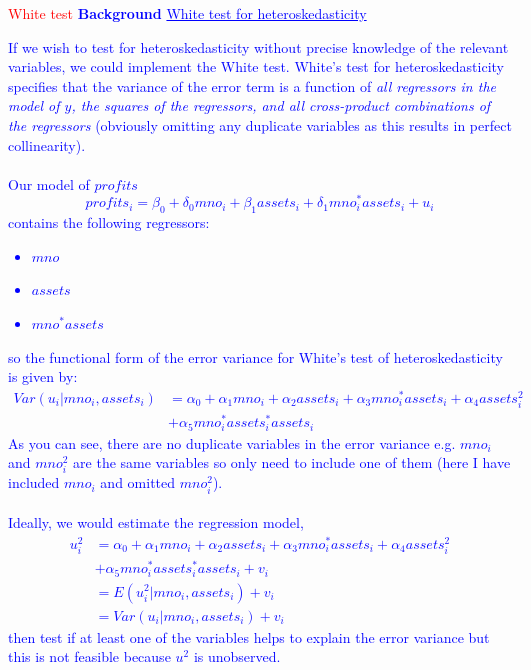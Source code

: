 \documentclass[12pt]{report}
\newenvironment{blueframed}[1][blue]
{\def\FrameCommand{\fboxsep=\FrameSep\fcolorbox{#1}{white}}%
\MakeFramed {\advance\hsize-\width \FrameRestore}}
{\endMakeFramed}
\begin{document}
\newpage
\justify
\noindent \textcolor{red}{White test}
\justify
\begin{blueframed}
	\textcolor{blue}{\textbf{Background}}
	\vspace{-\baselineskip}
	\justify
	\textcolor{blue}{\underline{White test for heteroskedasticity}}
	
	\noindent \textcolor{blue}
	{
		\noindent If we wish to test for heteroskedasticity without precise knowledge of the relevant variables, we could implement the White test. White's test for heteroskedasticity specifies that the variance of the error term is a function of \textit{all regressors in the model of $y$, the squares of the regressors, and all cross-product combinations of the regressors} (obviously omitting any duplicate variables as this results in perfect collinearity). \\ \\ Our model of $profits$ $$profits_i = \beta_0 + \delta_0 mno_i + \beta_1 assets_i + \delta_1 mno_i^*assets_i + u_i$$ contains the following regressors: \begin{itemize} \vspace{-\baselineskip} \item $mno$
				\item $assets$
				\item $mno^*assets$
			\end{itemize} so the functional form of the error variance for White's test of heteroskedasticity is given by:  \begin{align*}
				Var(u_i|mno_i,assets_i) &= \alpha_0 + \alpha_1 mno_i + \alpha_2 assets_i + \alpha_3 mno_i ^* assets_i + \alpha_4 assets_i^2 \\
				&+ \alpha_5 mno_i^*assets_i^*assets_i
			\end{align*} As you can see, there are no duplicate variables in the error variance e.g. $mno_i$ and $mno_i^2$ are the same variables so only need to include one of them (here I have included $mno_i$ and omitted $mno_i^2$). \\ \\
			Ideally, we would estimate the regression model, \begin{align*}
			u^2_i &= \alpha_0 + \alpha_1 mno_i + \alpha_2 assets_i + \alpha_3 mno_i ^* assets_i + \alpha_4 assets_i^2 \\
			&+ \alpha_5 mno_i^*assets_i^*assets_i + v_i \\
			&= E(u^2_i|mno_i,assets_i) + v_i \\
			&= Var(u_i|mno_i,assets_i) + v_i
			\end{align*} then test if at least one of the variables helps to explain the error variance but this is not feasible because $u^2$ is unobserved. 
	}
\end{blueframed}
\end{document}
